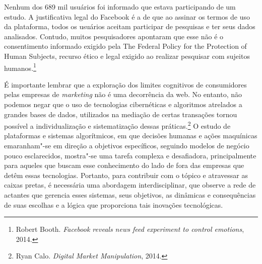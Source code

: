 Nenhum dos 689 mil usuários foi informado que estava participando de um
estudo. A justificativa legal do Facebook é a de que ao assinar os
termos de uso da plataforma, todos os usuários aceitam participar de
pesquisas e ter seus dados analisados. Contudo, muitos pesquisadores
apontaram que esse não é o consentimento informado exigido pela The
Federal Policy for the Protection of Human Subjects, recurso ético e
legal exigido ao realizar pesquisar com sujeitos humanos.\footnote{Robert Booth. \textit{Facebook reveals news feed experiment to control
emotions}, 2014.}

É importante lembrar que a exploração dos limites cognitivos de
consumidores pelas empresas de \textit{marketing} não é uma decorrência da web.
No entanto, não podemos negar que o uso de tecnologias cibernéticas e
algoritmos atrelados a grandes bases de dados, utilizados na mediação de
certas transações tornou possível a individualização e sistematização
dessas práticas.\footnote{Ryan Calo. \textit{Digital Market Manipulation}, 2014.} O estudo de plataformas e sistemas
algorítmicos, em que decisões humanas e ações maquínicas emaranham"-se em
direção a objetivos específicos, seguindo modelos de negócio pouco
esclarecidos, mostra"-se uma tarefa complexa e desafiadora,
principalmente para aqueles que buscam esse conhecimento do lado de fora
das empresas que detêm essas tecnologias. Portanto, para contribuir com
o tópico e atravessar as caixas pretas, é necessária uma abordagem
interdisciplinar, que observe a rede de actantes que gerencia esses
sistemas, seus objetivos, as dinâmicas e consequências de suas escolhas
e a lógica que proporciona tais inovações tecnológicas.


